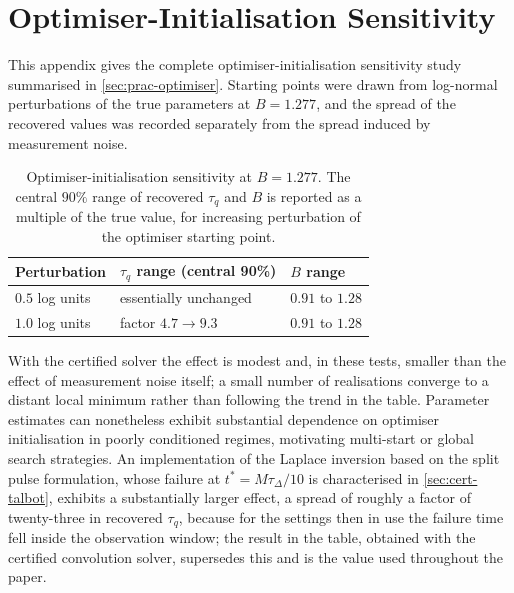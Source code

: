 \documentclass[preprint,12pt,a4paper]{elsarticle}
\theoremstyle{plain}
\theoremstyle{definition}
\theoremstyle{remark}
\newcommand{\tq}{\tau_{q}}
\newcommand{\Bnum}{B}
\begin{document}
\clearpage
\section{Optimiser-Initialisation Sensitivity}
\label{app:optimiser}

This appendix gives the complete optimiser-initialisation sensitivity study
summarised in \cref{sec:prac-optimiser}. Starting points were drawn from
log-normal perturbations of the true parameters at $\Bnum=1.277$, and the
spread of the recovered values was recorded separately from the spread
induced by measurement noise.

\begin{table}[htbp]
  \centering
  \caption{Optimiser-initialisation sensitivity at $\Bnum=1.277$. The central
           $90\%$ range of recovered $\tq$ and $\Bnum$ is reported as a
           multiple of the true value, for increasing perturbation of the
           optimiser starting point.}
  \label{tab:optimiser}
  \begin{tabular}{@{}lll@{}}
    \toprule
    \textbf{Perturbation} & \textbf{$\tq$ range (central 90\%)} & \textbf{$\Bnum$ range} \\
    \midrule
    $0.5$ log units & essentially unchanged & $0.91$ to $1.28$ \\
    $1.0$ log units & factor $4.7 \to 9.3$ & $0.91$ to $1.28$ \\
    \bottomrule
  \end{tabular}
\end{table}

With the certified solver the effect is modest and, in these tests, smaller
than the effect of measurement noise itself; a small number of realisations
converge to a distant local minimum rather than following the trend in the
table. Parameter estimates can nonetheless exhibit substantial dependence on
optimiser initialisation in poorly conditioned regimes, motivating multi-start
or global search strategies. An implementation of the Laplace inversion based
on the split pulse formulation, whose failure at $t^{\ast}=M\tau_{\Delta}/10$
is characterised in \cref{sec:cert-talbot}, exhibits a substantially larger
effect, a spread of roughly a factor of twenty-three in recovered $\tq$,
because for the settings then in use the failure time fell inside the
observation window; the result in the table, obtained with the certified
convolution solver, supersedes this and is the value used throughout the
paper.




\end{document}
